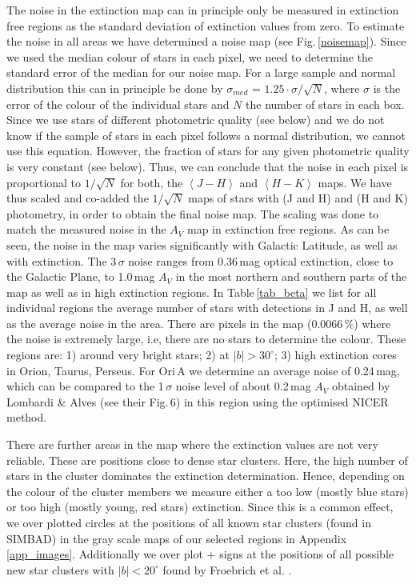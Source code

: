 \documentclass[useAMS,usenatbib]{mn2e}
\begin{document}
The noise in the extinction map can in principle only be measured in extinction
free regions as the standard deviation of extinction values from zero. To
estimate the noise in all areas we have determined a noise map (see
Fig.\,\ref{noisemap}). Since we used the median colour of stars in each
pixel, we need to determine the standard error of the median for our noise map.
For a large sample and normal distribution this can in principle be done by
$\sigma_{med}$ = $1.25 \cdot \sigma / \sqrt{N}$, where $\sigma$ is the error of
the colour of the individual stars and $N$ the number of stars in each box.
Since we use stars of different photometric quality (see below) and we do not
know if the sample of stars in each pixel follows a normal distribution, we
cannot use this equation. However, the fraction of stars for any given
photometric quality is very constant (see below). Thus, we can conclude that the
noise in each pixel is proportional to $ 1 / \sqrt{N}$ for both, the $\left< J-H
\right>$ and $\left< H-K \right>$ maps. We have thus scaled and co-added the $ 1
/ \sqrt{N}$ maps of stars with (J and H) and (H and K) photometry, in order to
obtain the final noise map. The scaling was done to match the measured noise in
the $A_V$ map in extinction free regions. As can be seen, the noise in the map
varies significantly with Galactic Latitude, as well as with extinction. The
3\,$\sigma$ noise ranges from 0.36\,mag optical extinction, close to the
Galactic Plane, to 1.0\,mag $A_V$ in the most northern and southern parts of the
map as well as in high extinction regions. In Table\,\ref{tab_beta} we list for
all individual regions the average number of stars with detections in J and H,
as well as the average noise in the area. There are pixels in the map
(0.0066\,\%) where the noise is extremely large, i.e, there are no stars to
determine the colour. These regions are: 1) around very bright stars; 2) at
$|b|>30^\circ$; 3) high extinction cores in Orion, Taurus, Perseus. For Ori\,A
we determine an average noise of 0.24\,mag, which can be compared to the
1\,$\sigma$ noise level of about 0.2\,mag $A_V$ obtained by Lombardi \& Alves
\cite{2001A&A...377.1023L} (see their Fig.\,6) in this region using the
optimised NICER method. 

There are further areas in the map where the extinction values are not very
reliable. These are positions close to dense star clusters. Here, the high
number of stars in the cluster dominates the extinction determination. Hence,
depending on the colour of the cluster members we measure either a too low
(mostly blue stars) or too high (mostly young, red stars) extinction. Since this
is a common effect, we over plotted circles at the positions of all known star
clusters (found in SIMBAD) in the gray scale maps of our selected regions in
Appendix\,\ref{app_images}. Additionally we over plot $+$ signs at the positions
of all possible new star clusters with $|b| < 20^\circ$ found by Froebrich et
al. \cite{2006MNRAS.subm.F}.
\end{document}
